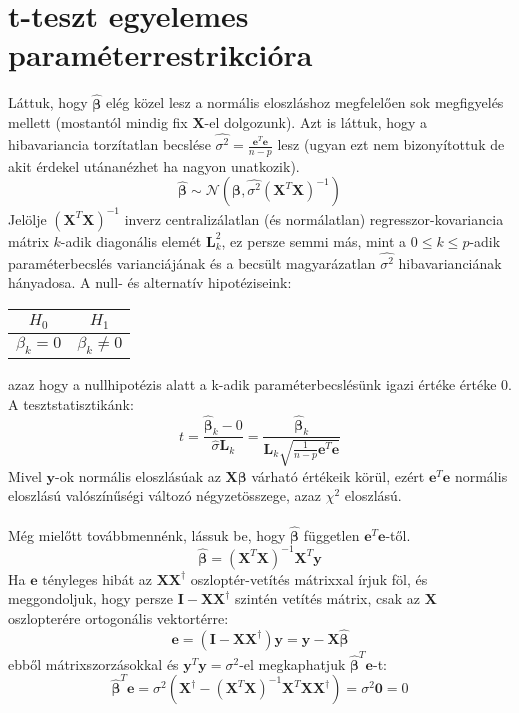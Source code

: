 \documentclass[14p]{report}
\def\pmb{\boldsymbol}
\def\ebeta{\hat{\pmb{\beta}}}
\newcounter{x}
\newcounter{y}
\newcounter{z}
\begin{document}
	\section{t-teszt egyelemes paraméterrestrikcióra}
	Láttuk, hogy $\ebeta$ elég közel lesz a normális eloszláshoz megfelelően sok megfigyelés mellett (mostantól mindig fix $\pmb{X}$-el dolgozunk). Azt is láttuk, hogy a hibavariancia torzítatlan becslése $\widehat{\sigma^2} = \frac{\pmb{e}^T\pmb{e}}{n-p}$ lesz (ugyan ezt nem bizonyítottuk de akit érdekel utánanézhet ha nagyon unatkozik).
	\[
		\ebeta \sim \mathcal{N}(\pmb{\beta}, \widehat{\sigma^2}(\pmb{X}^T\pmb{X})^{-1})
	\]
	Jelölje $(\pmb{X}^T\pmb{X})^{-1}$ inverz centralizálatlan (és normálatlan) regresszor-kovariancia mátrix $k$-adik diagonális elemét $\pmb{L}_{k}^2$, ez persze semmi más, mint a $0 \le k \le p$-adik paraméterbecslés varianciájának és a becsült magyarázatlan $\widehat{\sigma^2}$ hibavarianciának hányadosa. A null- és alternatív hipotéziseink:
	\begin{center}
		\begin{tabular}{|c|c|}
			\hline
			$H_0$ & $H_1$ \\
			\hline
			$\beta_k = 0$ & $\beta_k \ne 0$ \\
			\hline
		\end{tabular}
	\end{center}
	azaz hogy a nullhipotézis alatt a k-adik paraméterbecslésünk igazi értéke értéke $0$. A tesztstatisztikánk:
	\[
		t = \frac{\ebeta_k - 0}{\widehat{\sigma}\pmb{L}_{k}} = \frac{\ebeta_k}{\pmb{L}_k\sqrt{\frac{1}{n-p}\pmb{e}^T\pmb{e}}}
	\]
	Mivel $\pmb{y}$-ok normális eloszlásúak az $\pmb{X}\pmb{\beta}$ várható értékeik körül, ezért $\pmb{e}^T\pmb{e}$ normális eloszlású valószínűségi változó négyzetösszege, azaz $\chi^2$ eloszlású.
	\\
	\\
	Még mielőtt továbbmennénk, lássuk be, hogy $\ebeta$ független $\pmb{e}^T\pmb{e}$-től.
	\[
		\ebeta = (\pmb{X}^T\pmb{X})^{-1}\pmb{X}^T\pmb{y}
	\]
	Ha $\pmb{e}$ tényleges hibát az $\pmb{X}\pmb{X}^{\dagger}$ oszloptér-vetítés mátrixxal írjuk föl, és meggondoljuk, hogy persze $\pmb{I} - \pmb{X}\pmb{X}^{\dagger}$ szintén vetítés mátrix, csak az $\pmb{X}$ oszlopterére ortogonális vektortérre:
	\[
		\pmb{e} = (\pmb{I} - \pmb{X}\pmb{X}^{\dagger})\pmb{y} = \pmb{y} - \pmb{X}\ebeta
	\] 
	ebből mátrixszorzásokkal és $\pmb{y}^T\pmb{y} = \sigma^2$-el megkaphatjuk $\ebeta^T\pmb{e}$-t:
	\[
		\ebeta^T\pmb{e} = \sigma^2(\pmb{X}^{\dagger} - (\pmb{X}^T\pmb{X})^{-1}\pmb{X}^T\pmb{X}\pmb{X}^{\dagger}) = \sigma^2\pmb{0} = 0
	\]
\end{document}
